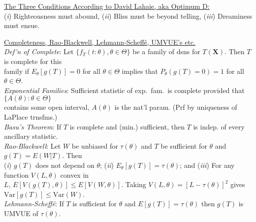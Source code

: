\documentclass[11pt]{article}
\newcommand{\Var}{\ensuremath{\mathrm{Var}}}
\newcommand{\vecX}{\ensuremath{\mathbf{X}}}
\begin{document}
\baselineskip 20pt
\oddsidemargin 0in
\evensidemargin 0in
\topmargin -20pt
\headsep 0pt
\headheight 0pt
\pagestyle{empty}
\setlength{\parindent}{-2em}
\small
\indent\underline{The Three Conditions According to David Lahaie, aka Optimum D:}\\
({\it i}) Righteousness must abound, ({\it ii}) Bliss must be beyond telling, ({\it iii}) Dreaminess
must ensue.

\indent\underline{Completeness, Rao-Blackwell, Lehmann-Scheff\'{e}, UMVUE's etc.}\\ 
{\it Def'n
of Complete}:  Let  $\{f_T(t:\theta), \theta \in \Theta \}$ be a family of dsns for $T(\vecX )$. 
Then $T$ is complete for this \\
\hspace*{1.5em}family if $E_\theta [g(T)] = 0$ for all $\theta \in \Theta$ implies
that
$P_\theta (g(T) = 0) = 1$ for all  $\theta \in \Theta$. \\
{\it Exponential Families}: Sufficient statistic of exp.\ fam.\ is complete provided that
$\{A(\theta{}): \theta \in \Theta \}$ \\
\hspace*{1.5em}contains some open interval, $A(\theta )$ is the nat'l
param. (Prf by uniqueness of LaPlace trnsfms.)\\ 
{\it Basu's Theorem}: If $T$ is complete
and (min.) sufficient, then $T$ is indep. of every ancillary statistic.\\
{\it Rao-Blackwell}:  Let $W$ be unbiased for $\tau (\theta)$ and $T$ be sufficient for $\theta$
and
$g(T) = E(W|T)$. Then \\
\hspace*{1.5em}({\it i}) $g(T)$ does not depend on $\theta$; ({\it ii}) $E_\theta
[g(T)]=\tau (\theta )$; and ({\it iii}) For any function $V(L,\theta)$ convex in \\
\hspace*{1.5em}$L$, $E[V(g(T),
\theta)] \leq E[V(W,\theta)]$. Taking $V(L,\theta)=[L-\tau (\theta)]^2$ gives $\Var [g(T)]\leq \Var
(W)$.\\
{\it Lehmann-Scheff\'{e}}:  If $T$  is sufficient for $\theta$ and  $E[g(T)] = \tau (\theta)$ then  
$g(T)$ is UMVUE of $\tau (\theta)$.
\end{document}

